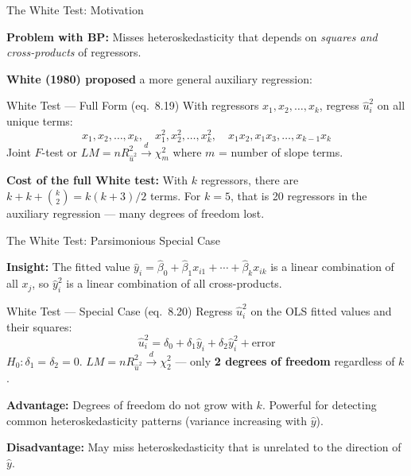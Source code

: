 \documentclass[aspectratio=169, 12pt]{beamer}
\begin{document}
\begin{frame}{The White Test: Motivation}

  \textbf{Problem with BP:} Misses heteroskedasticity that depends on \textit{squares and cross-products} of regressors.

  \smallskip

  \textbf{White (1980) proposed} a more general auxiliary regression:

  \begin{definitionbox}{White Test — Full Form (eq.\ 8.19)}
    With regressors $x_1, x_2, \ldots, x_k$, regress $\hat{u}_i^2$ on all unique terms:
    \[
      x_1, x_2, \ldots, x_k, \quad x_1^2, x_2^2, \ldots, x_k^2, \quad x_1 x_2, x_1 x_3, \ldots, x_{k-1}x_k
    \]
    Joint $F$-test or $LM = n R^2_{\hat{u}^2} \overset{d}{\to} \chi^2_m$ where $m$ = number of slope terms.
  \end{definitionbox}

  \smallskip

  \begin{keybox}
    \textbf{Cost of the full White test:} With $k$ regressors, there are $k + k + \binom{k}{2} = k(k+3)/2$ terms. For $k=5$, that is 20 regressors in the auxiliary regression — many degrees of freedom lost.
  \end{keybox}

\end{frame}

\begin{frame}{The White Test: Parsimonious Special Case}

  \textbf{Insight:} The fitted value $\hat{y}_i = \hat{\beta}_0 + \hat{\beta}_1 x_{i1} + \cdots + \hat{\beta}_k x_{ik}$ is a linear combination of all $x_j$, so $\hat{y}_i^2$ is a linear combination of all cross-products.

  \smallskip

  \begin{definitionbox}{White Test — Special Case (eq.\ 8.20)}
    Regress $\hat{u}_i^2$ on the OLS fitted values and their squares:
    \[
      \hat{u}_i^2 = \delta_0 + \delta_1 \hat{y}_i + \delta_2 \hat{y}_i^2 + \text{error}
    \]
    $H_0: \delta_1 = \delta_2 = 0$. \quad
    $LM = n R^2_{\hat{u}^2} \overset{d}{\to} \chi^2_2$ — only \textbf{2 degrees of freedom} regardless of $k$.
  \end{definitionbox}

  \smallskip

  \begin{keybox}
    \textbf{Advantage:} Degrees of freedom do not grow with $k$. Powerful for detecting common heteroskedasticity patterns (variance increasing with $\hat{y}$).

    \smallskip

    \textbf{Disadvantage:} May miss heteroskedasticity that is unrelated to the direction of $\hat{y}$.
  \end{keybox}

\end{frame}
\end{document}
